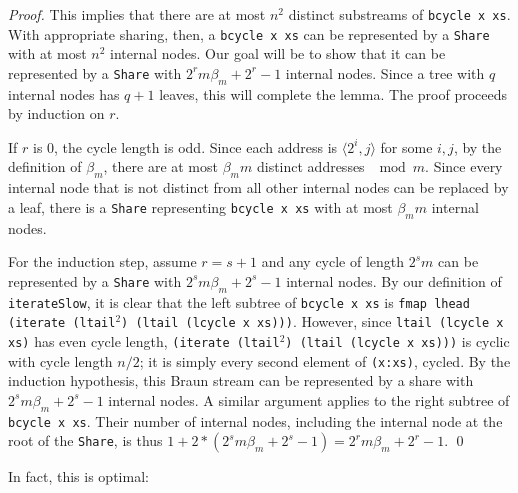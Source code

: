 \documentclass[envcountsect]{llncs}
\newcommand{\share}{{\tt Share} }
\begin{document}
\begin{proof}
This implies that there are at most $n^2$ distinct substreams of {\tt bcycle x xs}.
With appropriate sharing, then, a {\tt bcycle x xs} can be represented by a {\tt Share} with at most $n^2$ internal nodes.
Our goal will be to show that it can be represented by a {\tt Share} with $2^r m \beta_m + 2^r - 1$ internal nodes.
Since a tree with $q$ internal nodes has $q+1$ leaves, this will complete the lemma.
The proof proceeds by induction on $r$. 

If $r$ is $0$, the cycle length is odd.
Since each address is $\langle 2^i,j \rangle$ for some $i, j$, by the definition of $\beta_m$, there are at most $\beta_m m$ distinct addresses $\mod m$.
Since every internal node that is not distinct from all other internal nodes can be replaced by a leaf, there is a {\tt Share} representing {\tt bcycle x xs} with at most $\beta_m m$ internal nodes.

For the induction step, assume $r = s+1$ and any cycle of length $2^s m$ can be represented by a \share with $2^s m \beta_m + 2^s - 1$ internal nodes.
By our definition of {\tt iterateSlow}, it is clear that the left subtree of {\tt bcycle x xs} is {\tt fmap lhead (iterate (ltail}$^2${\tt ) (ltail (lcycle x xs)))}.
However, since {\tt ltail (lcycle x xs)} has even cycle length, {\tt (iterate (ltail}$^2${\tt ) (ltail (lcycle x xs)))} is cyclic with cycle length $n/2$;
it is simply every second element of {\tt (x:xs)}, cycled.
By the induction hypothesis, this Braun stream can be represented by a share with $2^s m \beta_m + 2^s - 1$ internal nodes.
A similar argument applies to the right subtree of {\tt bcycle x xs}.
Their number of internal nodes, including the internal node at the root of the {\tt Share}, is thus $1+2*(2^s m \beta_m + 2^s - 1) = 2^r m \beta_m + 2^r - 1$.
\qed
\end{proof}

In fact, this is optimal:
\end{document}
